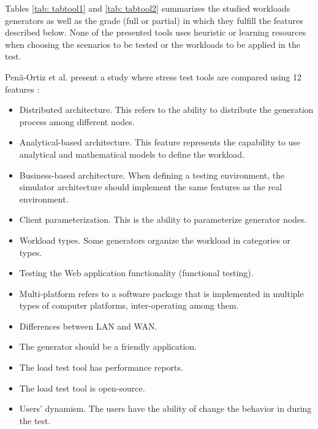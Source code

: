 \documentclass[espaco=umemeio,chapter=TITLE,twoside,openright]{abnt}
\begin{document}
Tables \ref{tab: tabtool1} and \ref{tab: tabtool2} summarizes the studied workloads generators as well as the grade (full or partial) in which they fulfill the features described below. None of the presented tools uses heuristic or learning resources when choosing the scenarios to be tested or the workloads to be applied in the test.

Penã-Ortiz et al. present a study where stress test tools are compared using 12 features \cite{MohammadS.Obaidat}:

\begin{itemize}
\item Distributed architecture. This refers to the ability to distribute the generation process among different nodes.
\item Analytical-based architecture. This feature represents the capability to use analytical and mathematical models to define the workload.
\item Business-based architecture. When defining a testing environment, the simulator architecture should implement the same features as the real environment.
\item Client parameterization. This is the ability to parameterize generator nodes.
\item Workload types. Some generators organize the workload in categories or types.
\item Testing the Web application functionality (functional testing).
\item Multi-platform refers to a software package that is implemented in multiple types of computer platforms, inter-operating among them.
\item Differences between LAN and WAN.
\item The generator should be a friendly application.
\item The load test tool has performance reports.
\item The load test tool is open-source.
\item Users’ dynamism. The users have the ability of change the behavior in during the test.
\end{itemize}
\end{document}

